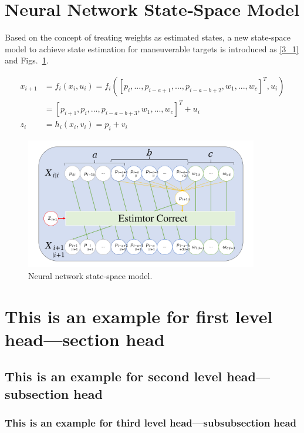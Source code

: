 \documentclass[sn-nature]{sn-jnl}%
\theoremstyle{thmstyleone}%
\theoremstyle{thmstyletwo}%
\theoremstyle{thmstylethree}%
\begin{document}
\section{Neural Network State‐Space Model}\label{sec3}

Based on the concept of treating weights as estimated states, a new state-space model to achieve state estimation for maneuverable targets is introduced as \eqref{3_1} and Figs.~\ref{fig:NNSSM}.

\begin{equation}
\begin{aligned}
{x_{i + 1}} &= {f_i}({x_i},{u_i}) = {f_i}({\left[ {{p_i},...,{p_{i-a+1}},...,{p_{i-a-b+2}},{w_1},...,{w_c}} \right]^T},{u_i})\\
 &= \left[ {{p_{i + 1}},{p_i},...,{p_{i-a-b+3}},{w_1},...,{w_c}} \right]^T + {u_i}\\
{z_i} &= {h_i}({x_i},{v_i}) = {p_i} + {v_i}
\end{aligned}
\label{3_1}
\end{equation}

\begin{figure}[!t]
  \centering
  \includegraphics[width=4in]{fig/fig3_1.png}
  \caption{Neural network state‐space model.}
  \label{fig:NNSSM}
\end{figure}

\section{This is an example for first level head---section head}\label{sec3}

\subsection{This is an example for second level head---subsection head}\label{subsec2}

\subsubsection{This is an example for third level head---subsubsection head}\label{subsubsec2}
\end{document}
